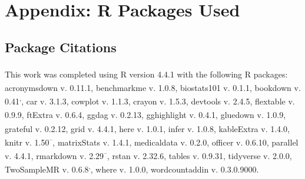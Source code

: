 \documentclass[
]{article}
\begin{document}
\newpage

\section{Appendix: R Packages Used}\label{appendix-pkg}

\subsection{Package Citations}\label{package-citations}

This work was completed using R version 4.4.1\textsuperscript{} with the following R packages: acronymsdown v. 0.11.1\textsuperscript{}, benchmarkme v. 1.0.8\textsuperscript{}, biostats101 v. 0.1.1\textsuperscript{}, bookdown v. 0.41\textsuperscript{,}, car v. 3.1.3\textsuperscript{}, cowplot v. 1.1.3\textsuperscript{}, crayon v. 1.5.3\textsuperscript{}, devtools v. 2.4.5\textsuperscript{}, flextable v. 0.9.9\textsuperscript{}, ftExtra v. 0.6.4\textsuperscript{}, ggdag v. 0.2.13\textsuperscript{}, gghighlight v. 0.4.1\textsuperscript{}, gluedown v. 1.0.9\textsuperscript{}, grateful v. 0.2.12\textsuperscript{}, grid v. 4.4.1\textsuperscript{}, here v. 1.0.1\textsuperscript{}, infer v. 1.0.8\textsuperscript{}, kableExtra v. 1.4.0\textsuperscript{}, knitr v. 1.50\textsuperscript{--}, matrixStats v. 1.4.1\textsuperscript{}, medicaldata v. 0.2.0\textsuperscript{}, officer v. 0.6.10\textsuperscript{}, parallel v. 4.4.1\textsuperscript{}, rmarkdown v. 2.29\textsuperscript{--}, rstan v. 2.32.6\textsuperscript{}, tables v. 0.9.31\textsuperscript{}, tidyverse v. 2.0.0\textsuperscript{}, TwoSampleMR v. 0.6.8\textsuperscript{,}, where v. 1.0.0\textsuperscript{}, wordcountaddin v. 0.3.0.9000\textsuperscript{}.
\end{document}
